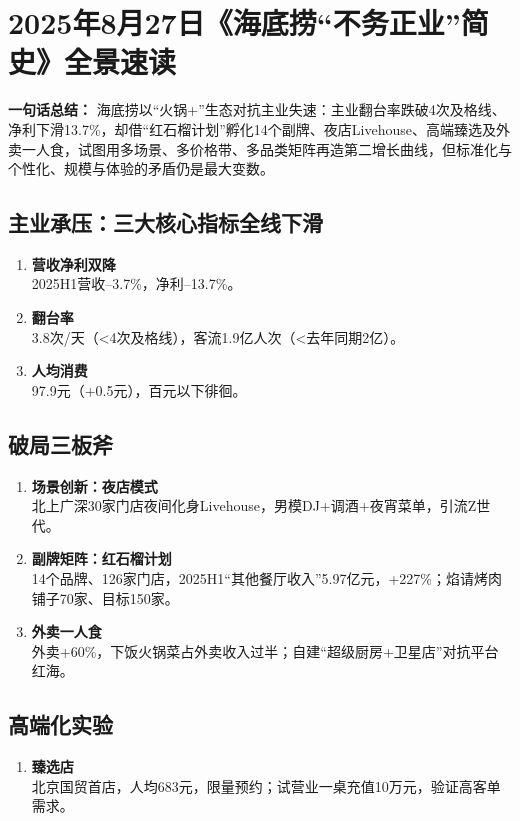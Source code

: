 \clearpage

\section{2025年8月27日《海底捞“不务正业”简史》全景速读}
\textbf{一句话总结：}  
海底捞以“火锅+”生态对抗主业失速：主业翻台率跌破4次及格线、净利下滑13.7\%，却借“红石榴计划”孵化14个副牌、夜店Livehouse、高端臻选及外卖一人食，试图用多场景、多价格带、多品类矩阵再造第二增长曲线，但标准化与个性化、规模与体验的矛盾仍是最大变数。

\subsection{主业承压：三大核心指标全线下滑}
\begin{enumerate}[leftmargin=*, nosep]
    \item \textbf{营收净利双降}  \\
    2025H1营收–3.7\%，净利–13.7\%。
    \item \textbf{翻台率}  \\
    3.8次/天（<4次及格线），客流1.9亿人次（<去年同期2亿）。
    \item \textbf{人均消费}  \\
    97.9元（+0.5元），百元以下徘徊。
\end{enumerate}

\subsection{破局三板斧}
\begin{enumerate}[leftmargin=*, nosep]
    \item \textbf{场景创新：夜店模式}  \\
    北上广深30家门店夜间化身Livehouse，男模DJ+调酒+夜宵菜单，引流Z世代。
    \item \textbf{副牌矩阵：红石榴计划}  \\
    14个品牌、126家门店，2025H1“其他餐厅收入”5.97亿元，+227\%；焰请烤肉铺子70家、目标150家。
    \item \textbf{外卖一人食}  \\
    外卖+60\%，下饭火锅菜占外卖收入过半；自建“超级厨房+卫星店”对抗平台红海。
\end{enumerate}

\subsection{高端化实验}
\begin{enumerate}[leftmargin=*, nosep]
    \item \textbf{臻选店}  \\
    北京国贸首店，人均683元，限量预约；试营业一桌充值10万元，验证高客单需求。
\end{enumerate}

